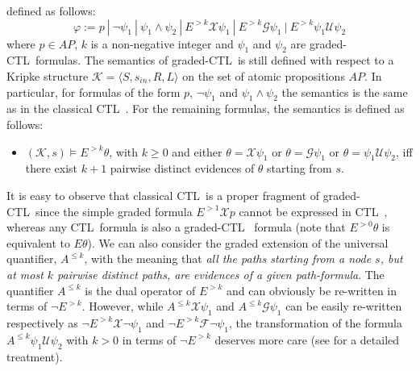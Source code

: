\documentclass[letterpaper,twocolumn,10pt]{article}
\newcommand{\ignore}[1]{}
\def    \ctl        {\mbox{\textsc{CTL }\xspace}}
\def    \U          {\mathcal{U}}
\def    \G          {\mathcal{G}}
\def    \F          {\mathcal{F}}
\def    \X          {\mathcal{X}}
\def    \K          {\mathcal{K}}
\begin{document}
defined as follows:
    $$\varphi := p\ |\ \neg \psi_1\ |\ \psi_1 \wedge \psi_2\ |\ E^{> k} \X \psi_1\ |\ E^{> k} \G \psi_1\ |\  E^{> k} \psi_1 \U \psi_2$$
where $p \in AP$, $k$ is a non-negative integer and $\psi_1$ and
$\psi_2$ are graded-\ctl formulas.
The semantics of graded-\ctl is still defined with respect to a
Kripke structure $\K = \langle S, s_{in}, R, L \rangle$ on the set
of atomic propositions $AP$. In particular, for formulas of the
form $p$, $\neg\psi_1$ and $\psi_1 \wedge \psi_2$ the semantics is the same as in the classical \ctl.
For the remaining formulas, the semantics is defined as follows:
\begin{itemize}
\item
$(\K, s) \models E^{> k} \theta$, with $k \geq 0$ and either $\theta = \X \psi_1$ or $\theta = \G \psi_1$ or $\theta = \psi_1 \U \psi_2$, iff there exist $k+1$ pairwise
distinct evidences of $\theta$ starting from $s$.
\end{itemize}
It is easy to observe that classical \ctl is a proper fragment of
graded-\ctl since the simple graded formula $E^{>1} \X p$ cannot be
expressed in \ctl, whereas any \ctl formula is also a graded-\ctl
formula  (note that $E^{>0} \theta$ is equivalent to $E \theta$).
We can also consider the graded extension of the universal
quantifier, $A^{\leq k}$, with the meaning that \emph{all the
paths starting from a node $s$, but at most $k$ pairwise distinct
paths, are evidences of a given path-formula}. The quantifier
$A^{\leq k}$ is the dual operator of $E^{>k}$ and can obviously be
re-written in terms of $\neg E^{>k}$. However, while $A^{\leq k}
\X \psi_1$ and $A^{\leq k} \G \psi_1$ can be easily re-written
respectively as $\neg E^{>k} \X \neg \psi_1$ and $\neg E^{>k} \F
\neg\psi_1$, the transformation of the formula $A^{\leq k} \psi_1
\U \psi_2$ with $k>0$ in terms of $\neg E^{>k}$ deserves more care
(see \cite{FNP08} for a detailed treatment).
\ignore{
In fact, we have that $A^{\leq k} \psi_1 \U \psi_2$
is equivalent to $\neg E^{> k} \neg(\psi_1 \U \psi_2)$ (note that this formula is
not a graded-\ctl formula because of the occurrence of the
innermost negation), that can be translated in graded-\ctl in the
following way:
\begin{eqnarray}
    A^{\leq k} \psi_1 \U \psi_2 &\Longleftrightarrow& \neg E^{>k} \G (\psi_1 \wedge \neg\psi_2)\ \wedge \neg E^{>k} (\psi_1 \wedge \neg\psi_2) \U (\neg\psi_1 \wedge \neg\psi_2) \wedge \label{for:ForallUntil} \\
    & & \bigwedge_{i=0}^{k-1} (\ \neg E^{>k-1-i} \G (\psi_1 \wedge \neg\psi_2)\ \vee\ \neg E^{>i} (\psi_1 \wedge \neg\psi_2) \U (\neg\psi_1 \wedge \neg\psi_2)\ ) \nonumber
\end{eqnarray}

In fact observe that a path not
satisfying $\psi_1 \U \psi_2$ is a path that satisfies either
$\theta_1 = \G (\psi_1 \wedge \neg\psi_2)$ or $\theta_2 = (\psi_1
\wedge \neg\psi_2) \U (\neg\psi_1 \wedge \neg\psi_2)$ (clearly,
the paths satisfying $\theta_1$ are all distinct from the paths
satisfying $\theta_2$). Therefore the formula $E^{>k} \neg(\psi_1
\U \psi_2)$ holds in $s$, if $k+1$ pairwise distinct paths stem
from this, each satisfying either $\theta_1$ or $\theta_2$.
}
\end{document}
